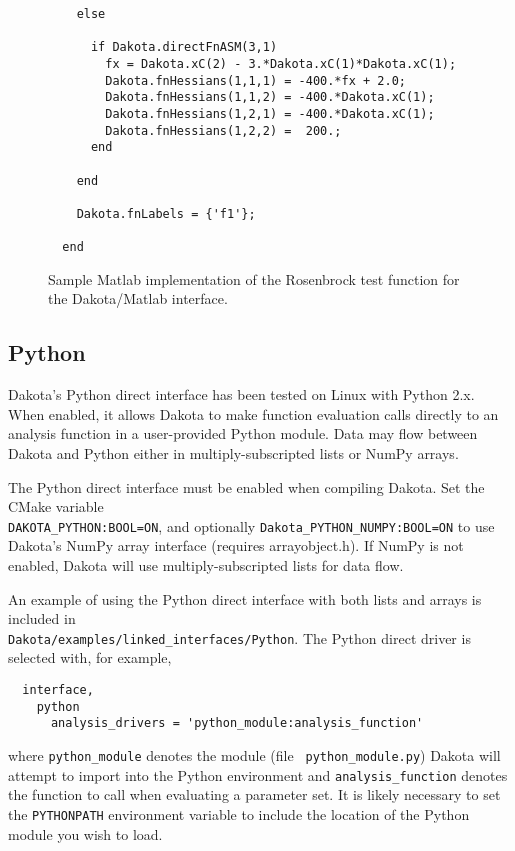 \begin{figure}
\begin{bigbox}
\begin{tiny}
\begin{verbatim}
    else
    
      if Dakota.directFnASM(3,1) 
        fx = Dakota.xC(2) - 3.*Dakota.xC(1)*Dakota.xC(1);
        Dakota.fnHessians(1,1,1) = -400.*fx + 2.0;
        Dakota.fnHessians(1,1,2) = -400.*Dakota.xC(1); 
        Dakota.fnHessians(1,2,1) = -400.*Dakota.xC(1);
        Dakota.fnHessians(1,2,2) =  200.;
      end
    
    end
  
    Dakota.fnLabels = {'f1'};
   
  end
\end{verbatim}
\end{tiny}
\end{bigbox}
\caption{Sample Matlab implementation of the Rosenbrock test function
for the Dakota/Matlab interface.\label{advint:figure:matlabrosen}}
\end{figure}

\subsection{Python}\label{advint:existingdirect:python} 

Dakota's Python direct interface has been tested on Linux with Python
2.x. When enabled, it allows Dakota to make function evaluation calls
directly to an analysis function in a user-provided Python module.
Data may flow between Dakota and Python either in multiply-subscripted
lists or NumPy arrays.

The Python direct interface must be enabled when compiling Dakota.
Set the CMake variable \\ {\tt DAKOTA\_PYTHON:BOOL=ON}, and optionally
{\tt Dakota\_PYTHON\_NUMPY:BOOL=ON} to use Dakota's NumPy array
interface (requires arrayobject.h). If NumPy is not enabled, Dakota
will use multiply-subscripted lists for data flow.

An example of using the Python direct interface with both lists and
arrays is included in \\
{\tt Dakota/examples/linked\_interfaces/Python}. The Python direct driver is
selected with, for example,
\begin{verbatim}
  interface,
    python
      analysis_drivers = 'python_module:analysis_function'
\end{verbatim}
where {\tt python\_module} denotes the module (file {\tt
python\_module.py}) Dakota will attempt to import into the Python
environment and {\tt analysis\_function} denotes the function to call
when evaluating a parameter set. It is likely necessary to set the
{\tt PYTHONPATH} environment variable to include the location of the
Python module you wish to load.


